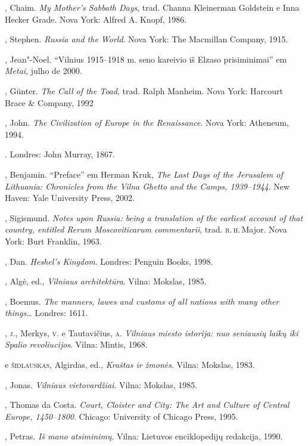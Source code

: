 \begin{bibliohedra}
  , Chaim. \textit{My Mother's Sabbath Days}, trad. Channa Kleinerman
  Goldstein e Inna Hecker Grade. Nova York: Alfred A. Knopf, 1986.

  , Stephen. \textit{Russia and the World}. Nova York: The Macmillan
  Company, 1915.

  , Jean"-Noel. ``Vilnius 1915--1918 m. seno kareivio iš Elzaso
  prisiminimai'' em \textit{Metai}, julho de 2000.

  , Günter. \textit{The Call of the Toad}, trad. Ralph Manheim. Nova
  York: Harcourt Brace \& Company, 1992

  , John. \textit{The Civilization of Europe in the Renaissance}. Nova
  York: Atheneum, 1994.

  . Londres:
  John Murray, 1867.

  , Benjamin. ``Preface'' em Herman Kruk, \textit{The Last Days of
  the Jerusalem of Lithuania: Chronicles from the Vilna Ghetto and the
  Camps, 1939--1944}. New
  Haven: Yale University Press, 2002.

  , Sigismund. \textit{Notes upon Russia: being a translation
  of the earliest account of that country, entitled Rerum Moscoviticarum
  commentarii}, trad. \textsc{r.\,h.}\,Major. Nova York: Burt
  Franklin, 1963.

  , Dan. \textit{Heshel's Kingdom}. Londres: Penguin Books, 1998.

  , Algė, ed., \textit{Vilniaus architektūra}. Vilna:
  Mokslas, 1985.

  , Boemus. \textit{The manners, lawes and customs of all nations
  with many other things\ldots{}} Londres: 1611.

  , \textsc{j}., Merkys, \textsc{v}. e Tautavičius, \textsc{a}. \textit{Vilniaus miesto
  istorija: nuo seniausių laikų iki Spalio revoliucijos}. Vilna:
  Mintis, 1968.

  \titidem e \textsc{šidlauskas}, Algirdas, ed., \textit{Kraštas ir
  žmonės}. Vilna: Mokslas, 1983.

  , Jonas. \textit{Vilniaus vietovardžiai}. Vilna: Mokslas,
  1985.

  , Thomas da Costa. \textit{Court, Cloister and City: The Art and
  Culture of Central Europe, 1450--1800}. Chicago: University of Chicago
  Press, 1995.

  , Petras. \textit{Iš mano atsiminimų}. Vilna: Lietuvos
  enciklopedijų redakcija, 1990.


\end{bibliohedra}

